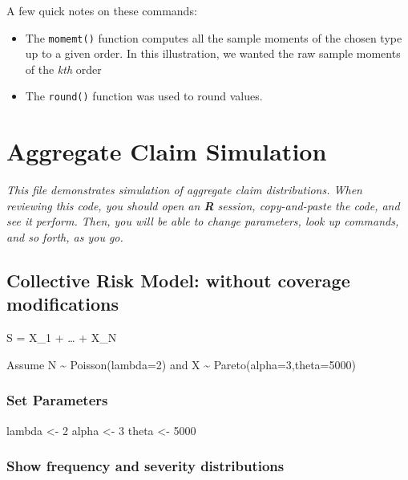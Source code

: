 \documentclass[]{book}
\newenvironment{Shaded}{\begin{snugshade}}{\end{snugshade}}
\newcommand{\DecValTok}[1]{\textcolor[rgb]{0.00,0.00,0.81}{#1}}
\newcommand{\StringTok}[1]{\textcolor[rgb]{0.31,0.60,0.02}{#1}}
\newcommand{\NormalTok}[1]{#1}
\providecommand{\tightlist}{%
  \setlength{\itemsep}{0pt}\setlength{\parskip}{0pt}}
\theoremstyle{definition}
\theoremstyle{definition}
\theoremstyle{definition}
\theoremstyle{remark}
\begin{document}
A few quick notes on these commands:

\begin{itemize}
\tightlist
\item
  The \texttt{momemt()} function computes all the sample moments of the
  chosen type up to a given order. In this illustration, we wanted the
  raw sample moments of the \emph{kth} order
\item
  The \texttt{round()} function was used to round values.
\end{itemize}

\chapter{Aggregate Claim Simulation}\label{aggregate-claim-simulation}

\emph{This file demonstrates simulation of aggregate claim
distributions. When reviewing this code, you should open an \textbf{R}
session, copy-and-paste the code, and see it perform. Then, you will be
able to change parameters, look up commands, and so forth, as you go.}

\section{Collective Risk Model: without coverage
modifications}\label{collective-risk-model-without-coverage-modifications}

S = X\_1 + \ldots{} + X\_N

Assume N \textasciitilde{} Poisson(lambda=2) and X \textasciitilde{}
Pareto(alpha=3,theta=5000)

\subsection{Set Parameters}\label{set-parameters}

\begin{Shaded}
\begin{Highlighting}[]
\NormalTok{lambda <-}\StringTok{ }\DecValTok{2}
\NormalTok{alpha <-}\StringTok{ }\DecValTok{3}
\NormalTok{theta <-}\StringTok{ }\DecValTok{5000}
\end{Highlighting}
\end{Shaded}

\subsection{Show frequency and severity
distributions}\label{show-frequency-and-severity-distributions}
\end{document}
